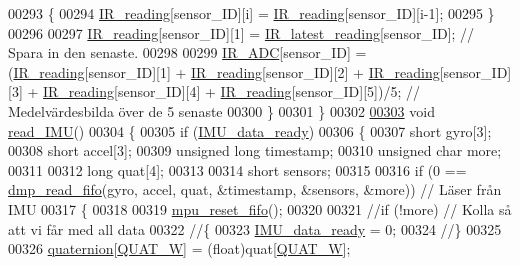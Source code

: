 \begin{DoxyCode}
00293         \{
00294             \hyperlink{sensor_8h_a760424856faf789a5a9d799bed405668}{IR\_reading}[sensor\_ID][i] = \hyperlink{sensor_8h_a760424856faf789a5a9d799bed405668}{IR\_reading}[sensor\_ID][i-1];
00295         \}
00296 
00297         \hyperlink{sensor_8h_a760424856faf789a5a9d799bed405668}{IR\_reading}[sensor\_ID][1] = \hyperlink{sensor_8h_a59d49b9b5c4c473c2c5cb4fcabb2bb36}{IR\_latest\_reading}[sensor\_ID]; \textcolor{comment}{// Spara in den
       senaste.}
00298 
00299         \hyperlink{sensor_8h_a9b74d5e1cbbe4f3668e310bdb07b34e8}{IR\_ADC}[sensor\_ID] = (\hyperlink{sensor_8h_a760424856faf789a5a9d799bed405668}{IR\_reading}[sensor\_ID][1] + 
      \hyperlink{sensor_8h_a760424856faf789a5a9d799bed405668}{IR\_reading}[sensor\_ID][2] + \hyperlink{sensor_8h_a760424856faf789a5a9d799bed405668}{IR\_reading}[sensor\_ID][3] + 
      \hyperlink{sensor_8h_a760424856faf789a5a9d799bed405668}{IR\_reading}[sensor\_ID][4] + \hyperlink{sensor_8h_a760424856faf789a5a9d799bed405668}{IR\_reading}[sensor\_ID][5])/5; \textcolor{comment}{// Medelvärdesbilda över de 5
       senaste}
00300     \}
00301 \}
00302 
\hypertarget{sensor_8c_source.tex_l00303}{}\hyperlink{sensor_8h_ad5232fda58bb026c495517be3c84307a}{00303} \textcolor{keywordtype}{void} \hyperlink{sensor_8c_ad5232fda58bb026c495517be3c84307a}{read\_IMU}()
00304 \{
00305     \textcolor{keywordflow}{if} (\hyperlink{sensor_8h_aada9974f9914a0bef6efe028d48ae383}{IMU\_data\_ready})
00306     \{
00307         \textcolor{keywordtype}{short} gyro[3];
00308         \textcolor{keywordtype}{short} accel[3];
00309         \textcolor{keywordtype}{unsigned} \textcolor{keywordtype}{long} timestamp;
00310         \textcolor{keywordtype}{unsigned} \textcolor{keywordtype}{char} more;
00311 
00312         \textcolor{keywordtype}{long} quat[4];
00313 
00314         \textcolor{keywordtype}{short} sensors;
00315 
00316         \textcolor{keywordflow}{if} (0 == \hyperlink{group___d_r_i_v_e_r_s_ga02db5f25359abe84be002c543cdc3803}{dmp\_read\_fifo}(gyro, accel, quat, &timestamp, &sensors, &more)) \textcolor{comment}{// Läser från
       IMU}
00317         \{
00318 
00319             \hyperlink{group___d_r_i_v_e_r_s_gaf23e9f57c0059be6ec57862f0584de10}{mpu\_reset\_fifo}();
00320 
00321             \textcolor{comment}{//if (!more) // Kolla så att vi får med all data}
00322             \textcolor{comment}{//\{}
00323             \hyperlink{sensor_8h_aada9974f9914a0bef6efe028d48ae383}{IMU\_data\_ready} = 0;
00324             \textcolor{comment}{//\}}
00325 
00326             \hyperlink{sensor_8h_a0ad4931324e527c53bc98710a6d0dd39}{quaternion}[\hyperlink{sensor_8h_a3cff338e3722c1c1a36de82d2a953bd3}{QUAT\_W}] = (float)quat[\hyperlink{sensor_8h_a3cff338e3722c1c1a36de82d2a953bd3}{QUAT\_W}];

\end{DoxyCode}
